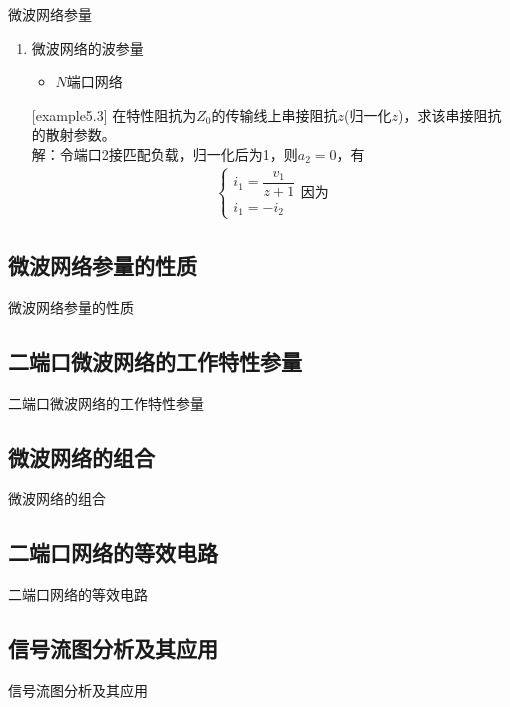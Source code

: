 \begin{frame}{微波网络参量}
    \begin{enumerate}
        \resume
        \item 微波网络的波参量 \\
              \begin{itemize}
                  \item $N$端口网络
              \end{itemize}
        [example5.3] 在特性阻抗为$Z_0$的传输线上串接阻抗$z$(归一化$z$)，求该串接阻抗的散射参数。\\
        解：令端口2接匹配负载，归一化后为1，则$a_2=0$，有
        \begin{align*}
            \begin{cases}
                i_1=\dfrac{v_1}{z+1}\\
                i_1=-i_2
            \end{cases}
        因为
        \end{align*}
    \end{enumerate}
\end{frame}

\subsection{微波网络参量的性质}
\begin{frame}{微波网络参量的性质}

\end{frame}

\subsection{二端口微波网络的工作特性参量}
\begin{frame}{二端口微波网络的工作特性参量}

\end{frame}

\subsection{微波网络的组合}
\begin{frame}{微波网络的组合}

\end{frame}

\subsection{二端口网络的等效电路}
\begin{frame}{二端口网络的等效电路}

\end{frame}

\subsection{信号流图分析及其应用}
\begin{frame}{信号流图分析及其应用}

\end{frame}

